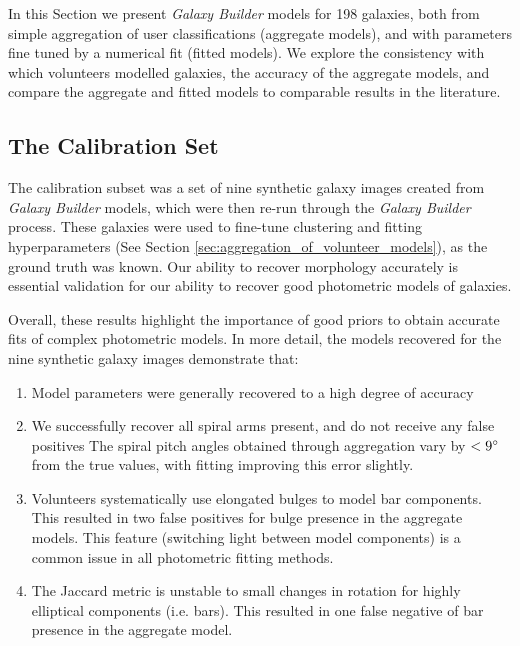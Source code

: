 \documentclass[../main.tex]{subfiles}
\begin{document}
\label{sec:results}

In this Section we present \textit{Galaxy Builder} models for 198 galaxies, both from simple aggregation of user classifications (aggregate models), and with parameters fine tuned by a numerical fit (fitted models). We explore the consistency with which volunteers modelled galaxies, the accuracy of the aggregate models, and compare the aggregate and fitted models to comparable results in the literature.

\subsection{The Calibration Set}

The calibration subset was a set of nine synthetic galaxy images created from \textit{Galaxy Builder} models, which were then re-run through the \textit{Galaxy Builder} process. These galaxies were used to fine-tune clustering and fitting hyperparameters (See Section \ref{sec:aggregation_of_volunteer_models}), as the ground truth was known. Our ability to recover morphology accurately is essential validation for our ability to recover good photometric models of galaxies.

Overall, these results highlight the importance of good priors to obtain accurate fits of complex photometric models. In more detail, the models recovered for the nine synthetic galaxy images demonstrate that:

\begin{enumerate}
  \item Model parameters were generally recovered to a high degree of accuracy
  \item We successfully recover all spiral arms present, and do not receive any false positives
The spiral pitch angles obtained through aggregation vary by $< 9\degree$ from the true values, with fitting improving this error slightly.
  \item Volunteers systematically use elongated bulges to model bar components. This resulted in two false positives for bulge presence in the aggregate models. This feature (switching light between model components) is a common issue in all photometric fitting methods.
  \item The Jaccard metric is unstable to small changes in rotation for highly elliptical components (i.e. bars). This resulted in one false negative of bar presence in the aggregate model.
\end{enumerate}
\end{document}

